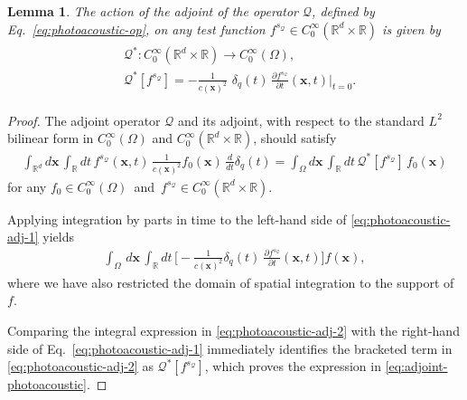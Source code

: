 \documentclass[10pt,a4paper]{amsart}
\newtheorem{lemma}{Lemma}
\newcommand{\bx}{\boldsymbol{x}}
\begin{document}
\begin{lemma}
 The action of the adjoint of the operator \(\mathcal{Q} \), defined by Eq.~\eqref{eq:photoacoustic-op}, on any test function 
    \( f^{s_{\mathcal{Q}}} \in C_0^\infty(\mathbb{R}^d \times \mathbb{R}) \) is given by
    \begin{align}  \label{eq:adjoint-photoacoustic}
        \begin{split}
        &\mathcal{Q}^*: C_0^\infty(\mathbb{R}^d \times \mathbb{R}) 
        \rightarrow C_0^\infty(\Omega), \\
        &\mathcal{Q}^*[f^{s_{\mathcal{Q}}}]
        = - \frac{1}{c(\bx)^2}\,  \,   \delta_q(t) \, \frac{\partial  f^{s_{\mathcal{Q}} } }{\partial t}
       (\bx,t) \rvert_{t=0}.
       \end{split}
    \end{align}
\end{lemma}

\begin{proof}
The adjoint operator \( \mathcal{Q}\) and its adjoint, with respect to the standard 
\(L^2\) bilinear form in  \(C_0^\infty(\Omega)\) and \(C_0^\infty(\mathbb{R}^d \times \mathbb{R})\), should satisfy
\begin{align} \label{eq:photoacoustic-adj-1}
        \int_{\mathbb{R}^d} d\bx \, \int_{\mathbb{R}} dt \,
        f^{s_{\mathcal{Q}}}(\bx,t)  \,
        \frac{1}{c(\bx)^2} f_0(\bx)  \,  \frac{d}{dt}  \delta_q(t)
        = \int_{\Omega} d\bx \, \int_{\mathbb{R}} dt \, \mathcal{Q}^*[f^{s_{\mathcal{Q}}}]  \, f_0(\bx)
\end{align}
for any  \( f_0 \in C_0^\infty(\Omega)\)~and~\(f^{s_{\mathcal{Q}}} \in C_0^\infty(\mathbb{R}^d \times \mathbb{R})\).

Applying integration by parts in time to the left-hand side of 
\eqref{eq:photoacoustic-adj-1} yields
\begin{align} \label{eq:photoacoustic-adj-2}
    \int_{\Omega} \, d\bx \,   \int_{\mathbb{R}}   dt  \,  \Big[ - \frac{1}{ c(\bx)^2} 
    \delta_q(t) \
    \frac{\partial f^{s_{\mathcal{Q}}} }{\partial t} (\bx,t)  \Big]
    f(\bx),
\end{align}
where we have also restricted the domain of spatial integration to the support of \(f\).

Comparing the integral expression in \eqref{eq:photoacoustic-adj-2} with the right-hand side of Eq.~\eqref{eq:photoacoustic-adj-1} immediately identifies the bracketed term in \eqref{eq:photoacoustic-adj-2} as \(\mathcal{Q}^*[f^{s_{\mathcal{Q}}}]\), which proves the expression in \eqref{eq:adjoint-photoacoustic}.
\end{proof}
\end{document}
